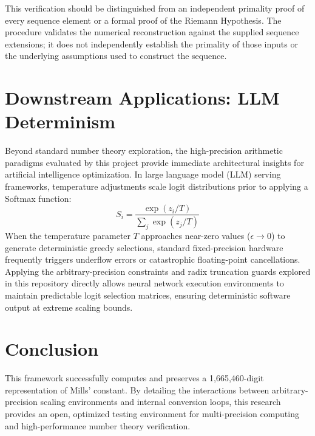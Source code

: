 \documentclass{article}
\begin{document}
This verification should be distinguished from an independent primality proof of every sequence element or a formal proof of the Riemann Hypothesis. The procedure validates the numerical reconstruction against the supplied sequence extensions; it does not independently establish the primality of those inputs or the underlying assumptions used to construct the sequence.

\section{Downstream Applications: LLM Determinism}
Beyond standard number theory exploration, the high-precision arithmetic paradigms evaluated by this project provide immediate architectural insights for artificial intelligence optimization. In large language model (LLM) serving frameworks, temperature adjustments scale logit distributions prior to applying a Softmax function:
\begin{equation}
    S_i = \frac{\exp(z_i / T)}{\sum_{j} \exp(z_j / T)}
\end{equation}
When the temperature parameter $T$ approaches near-zero values ($\epsilon \to 0$) to generate deterministic greedy selections, standard fixed-precision hardware frequently triggers underflow errors or catastrophic floating-point cancellations. Applying the arbitrary-precision constraints and radix truncation guards explored in this repository directly allows neural network execution environments to maintain predictable logit selection matrices, ensuring deterministic software output at extreme scaling bounds.

\section{Conclusion}
This framework successfully computes and preserves a 1,665,460-digit representation of Mills' constant. By detailing the interactions between arbitrary-precision scaling environments and internal conversion loops, this research provides an open, optimized testing environment for multi-precision computing and high-performance number theory verification.
\end{document}
